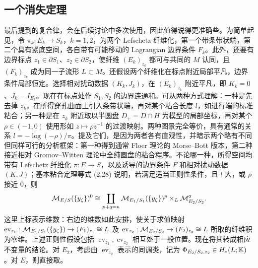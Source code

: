 \subsection{一个消失定理}\label{sec:17c}
最后提到的复合律，会在后续讨论中多次使用，因此值得说得更准确些。为简单起见，令 $\pi_k:E_k\to S_k$，$k=1,2$，为两个 Lefschetz 纤维化，第一个带条带状端，第二个具有紧底空间，各自带有可能移动的 Lagrangian 边界条件 $F_k$。此外，还要有边界标点 $z_1\in\partial S_1$、$z_2\in\partial S_2$，使纤维 $(E_k)_{z_k}$
都可与共同的 $M$ 认同，且 $(F_k)_{z_k}$ 成为同一子流形 $L\subset M$。还假设两个纤维化在标点附近局部平凡，边界条件局部恒定。选择相对扰动数据 $(K_k,J_k)$，在 $(E_k)_{z_k}$ 附近平凡，即 $K_k=0$、$J_k=I_{E_k}$。现在在标点处作 $S_1,S_2$ 的边界连通和。可从两种方式理解：一种是先去掉 $z_k$，在所得穿孔曲面上引入条带状端，再对某个粘合长度 $l$，如进行端的标准粘合；另一种是在 $z_k$ 附近取以半圆盘 $D_+=D\cap H$ 为模型的局部坐标，再对某个 $\rho\in(-1,0)$ 使用形如 $z\mapsto\rho z^{-1}$ 的过渡映射。两种图景完全等价，具有通常的关系 $l=-\log(-\rho)/\pi$。提及它们，是因为两者各有直观性，并暗示两个略有不同但同样可行的分析框架：第一种得到通常 Floer 理论的 Morse–Bott 版本，第二种接近相对 Gromov–Witten 理论中全纯圆盘的粘合程序。不论哪一种，所得空间均带有 Lefschetz 纤维化 $\pi:E\to S$，以及诱导的边界条件 $F$ 和相对扰动数据 $(K,J)$；基本粘合定理等式 (2.28) 说明，若满足适当正则性条件，且 $l$ 大，或 $\rho$ 接近 $0$，则
\begin{equation}\label{eq:17.11}
\mathcal M_{E/S}(\{y_\zeta\})^0\cong
\coprod_{p+q=n}\mathcal M_{E_1/S_1}(\{y_\zeta\})^p\times_L\mathcal M_{E_2/S_2}^q.
\end{equation}
这里上标表示维数：右边的维数如此安排，使关于求值映射 $\operatorname{ev}_{z_1}:\mathcal M_{E_1/S_1}(\{y_\zeta\})\to(F_1)_{z_1}\cong L$ 及 $\operatorname{ev}_{z_2}:\mathcal M_{E_2/S_2}\to(F_2)_{z_2}\cong L$ 所取的纤维积为零维。上述正则性假设包括 $\operatorname{ev}_{z_1},\operatorname{ev}_{z_2}$ 相互处于一般位置。现在将其转成相应不变量的结论。对 $E_2$，考虑由 $\operatorname{ev}_{z_2}$ 表示的同调类，记为 $\Phi_{E_2/S_2,z_2}\in H_*(L;\mathbb K)$。对 $E$，则直接取。

